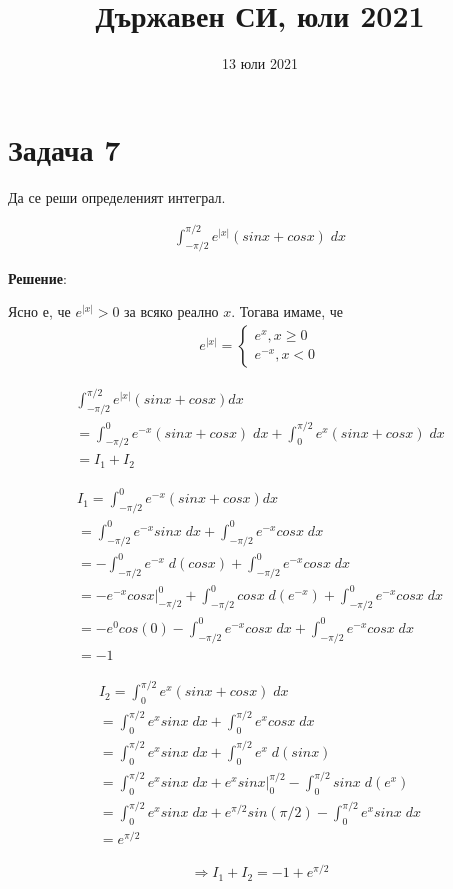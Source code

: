 \documentclass[fleqn,12pt]{article}
\title{Държавен СИ, юли 2021}
\date{13 юли 2021}
\begin{document}
\maketitle

\section{Задача 7}
Да се реши определеният интеграл.

\begin{gather*}
    \int_{-\pi/2}^{\pi/2} e^{|x|}(sinx + cosx) \; dx
\end{gather*}

\vspace{10pt}

\textbf{Решение}: 

Ясно е, че $e^{|x|} > 0$ за всяко реално $x$. Тогава имаме, че
\begin{gather*}
    e^{|x|} = 
    \begin{cases}
        e^x, x \geq 0 \\
        e^{-x}, x < 0
    \end{cases}
\end{gather*}

\begin{gather*} 
    \int_{-\pi/2}^{\pi/2} e^{|x|}(sinx + cosx) dx \\
    = \int_{-\pi/2}^{0} e^{-x}(sinx + cosx) \; dx + \int_{0}^{\pi/2} e^{x}(sinx + cosx) \; dx \\
    = I_1 + I_2
\end{gather*}

\begin{gather*}
    I_1 = \int_{-\pi/2}^{0} e^{-x}(sinx + cosx) dx \\
    = \int_{-\pi/2}^{0} e^{-x}sinx \; dx + \int_{-\pi/2}^{0} e^{-x}cosx \; dx \\
    = -\int_{-\pi/2}^{0} e^{-x} \; d(cosx) + \int_{-\pi/2}^{0} e^{-x}cosx \; dx \\
    = -e^{-x}cosx | ^{0}_{-\pi/2} + \int_{-\pi/2}^{0} cosx \; d(e^{-x}) + \int_{-\pi/2}^{0} e^{-x}cosx \; dx \\
    = -e^{0}cos(0) - \int_{-\pi/2}^{0} e^{-x}cosx \; dx + \int_{-\pi/2}^{0} e^{-x}cosx \; dx \\
    = - 1
\end{gather*}

\begin{gather*}
    I_2 = \int_{0}^{\pi/2} e^{x}(sinx + cosx) \; dx \\
    = \int_{0}^{\pi/2} e^{x}sinx \; dx + \int_{0}^{\pi/2} e^{x}cosx \; dx \\
    = \int_{0}^{\pi/2} e^{x}sinx \; dx + \int_{0}^{\pi/2} e^{x} \; d(sinx) \\
    = \int_{0}^{\pi/2} e^{x}sinx \; dx + e^{x}sinx | ^{\pi/2}_{0} - \int_{0}^{\pi/2} sinx \; d(e^{x}) \\
    = \int_{0}^{\pi/2} e^{x}sinx \; dx + e^{\pi/2}sin(\pi/2) - \int_{0}^{\pi/2} e^{x}sinx \; dx \\
    = e^{\pi/2}
\end{gather*}

\begin{gather*}
    \Longrightarrow  I_1 + I_2 = -1 + e^{\pi/2}
\end{gather*}
\end{document}

